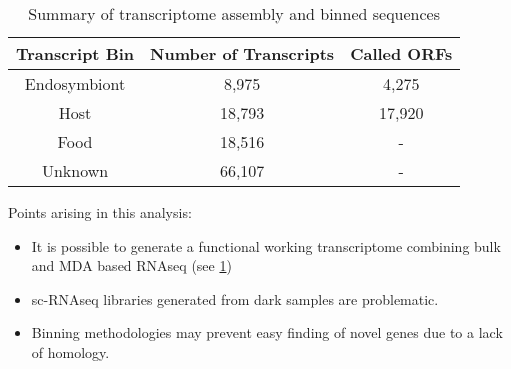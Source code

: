 \begin{table}
\centering
\begin{tabular}{|c|c|c|}
        \hline
        \textbf{Transcript Bin} & \textbf{Number of Transcripts} & \textbf{Called ORFs} \\
        \hline
        Endosymbiont  & 8,975 & 4,275 \\
        Host & 18,793 & 17,920 \\
        Food & 18,516 &  - \\
        Unknown & 66,107 & - \\
        \hline
\end{tabular}
    \caption[Summary of Transcriptome Bins]{Summary of transcriptome assembly and binned sequences}
    \label{tab:bin_assem_summary}
\end{table}

Points arising in this analysis:
\begin{itemize}
    \item It is possible to generate a functional working transcriptome combining bulk and MDA based RNAseq (see \cref{tab:bin_assem_summary})
    \item sc-RNAseq libraries generated from dark samples are problematic.
    \item Binning methodologies may prevent easy finding of novel genes due to a lack of homology. 
\end{itemize}


